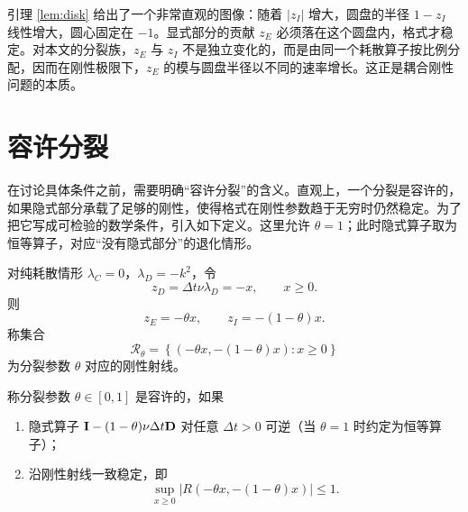 引理 \ref{lem:disk} 给出了一个非常直观的图像：随着 $|z_I|$ 增大，圆盘的半径 $1-z_I$ 线性增大，圆心固定在 $-1$。显式部分的贡献 $z_E$ 必须落在这个圆盘内，格式才稳定。对本文的分裂族，$z_E$ 与 $z_I$ 不是独立变化的，而是由同一个耗散算子按比例分配，因而在刚性极限下，$z_E$ 的模与圆盘半径以不同的速率增长。这正是耦合刚性问题的本质。

\section{容许分裂}
\label{sec:admissible}

在讨论具体条件之前，需要明确“容许分裂”的含义。直观上，一个分裂是容许的，如果隐式部分承载了足够的刚性，使得格式在刚性参数趋于无穷时仍然稳定。为了把它写成可检验的数学条件，引入如下定义。这里允许 $\theta=1$；此时隐式算子取为恒等算子，对应“没有隐式部分”的退化情形。

\begin{definition}[刚性射线]
  对纯耗散情形 $\lambda_C=0$，$\lambda_D=-k^2$，令
  \begin{equation}
    z_D=\Delta t\nu\lambda_D=-x,\qquad x\ge0.
    \label{eq:zD}
  \end{equation}
  则
  \begin{equation}
    z_E=-\theta x,\qquad z_I=-(1-\theta)x.
    \label{eq:stiff-ray}
  \end{equation}
  称集合
  \begin{equation}
    \mathcal{R}_\theta=\left\{\left(-\theta x,-(1-\theta)x\right):x\ge0\right\}
    \label{eq:ray-set}
  \end{equation}
  为分裂参数 $\theta$ 对应的刚性射线。
\end{definition}

\begin{definition}[容许分裂]
  \label{def:admissible}
  称分裂参数 $\theta\in[0,1]$ 是容许的，如果
  \begin{enumerate}[label=(\roman*),leftmargin=2.4em]
    \item 隐式算子 ${\mathbf{I}}-(1-\theta)\nu\Delta t{\mathbf{D}}$ 对任意 $\Delta t>0$ 可逆（当 $\theta=1$ 时约定为恒等算子）；
    \item 沿刚性射线一致稳定，即
    \begin{equation}
      \sup_{x\ge0}\left|R\left(-\theta x,-(1-\theta)x\right)\right|\le1.
      \label{eq:admissible-condition}
    \end{equation}
  \end{enumerate}
\end{definition}

